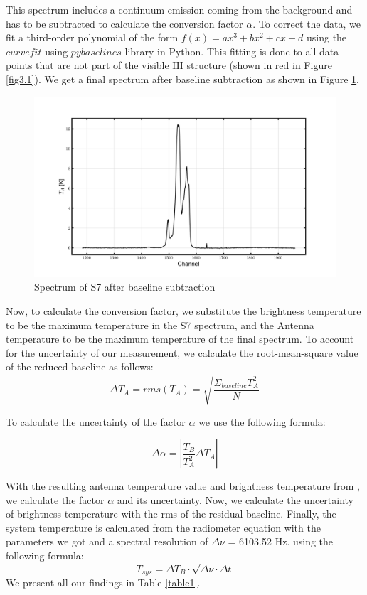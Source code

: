 \documentclass[12pt]{article}
\begin{document}
This spectrum includes a continuum emission coming from the background and has to be subtracted to calculate the conversion factor $\alpha$. To correct the data, we fit a third-order polynomial of the form $f(x) = ax^{3} + bx^{2} + cx + d$ using the $curvefit$ using $pybaselines$ library in Python. This fitting is done to all data points that are not part of the visible HI structure (shown in red in Figure \ref{fig3.1}). We get a final spectrum after baseline subtraction as shown in Figure \ref{fig3.2}.

\begin{figure}[H]
    \centering
    \includegraphics[width = \textwidth]{fig/calibration_baseline_removal.png}
    \caption{Spectrum of S7 after baseline subtraction}
    \label{fig3.2}
\end{figure}

Now, to calculate the conversion factor, we substitute the brightness temperature to be the maximum temperature in the S7 spectrum, and the Antenna temperature to be the maximum temperature of the final spectrum. To account for the uncertainty of our measurement, we calculate the root-mean-square value of the reduced baseline as follows:
\begin{equation}
    \Delta T_A = rms(T_A) = \sqrt{\frac{\Sigma_{baseline} T^{2}_A}{N}} 
\end{equation}


To calculate the uncertainty of the factor $\alpha$ we use the following formula:

\begin{equation}
    \Delta \alpha = \left| \frac{T_B}{T_A^{2}} \Delta T_A \right|
\end{equation}



With the resulting antenna temperature value and brightness temperature from \cite{calibration}, we calculate the factor $\alpha$ and its uncertainty.
Now, we calculate the uncertainty of brightness temperature with the rms of the residual baseline. Finally, the system temperature is calculated from the radiometer equation \cite{lecturenote} with the parameters we got and a spectral resolution of $\Delta \nu$ = 6103.52 Hz. using the following formula:
\begin{equation}
    T_{sys} = \Delta T_{B} \cdot \sqrt{\Delta \nu \cdot \Delta t} 
\end{equation}
We present all our findings in Table \ref{table1}.
\end{document}
